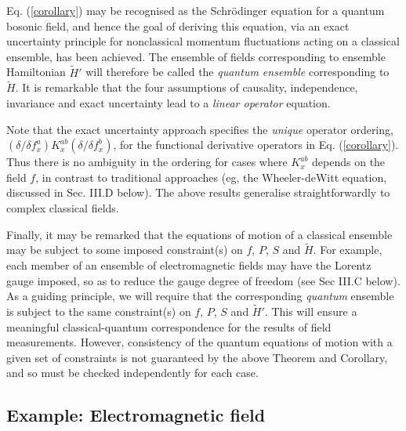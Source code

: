 \documentclass[a4paper,preprint, showpacs, aps, draft]{revtex4}
\begin{document}
{Eq. (\ref{corollary}) may be recognised as the Schr\"{o}dinger equation
for a quantum bosonic field, and hence the goal of
deriving this equation, via an exact uncertainty principle for 
nonclassical
momentum fluctuations acting on a classical ensemble, has been achieved.  
The ensemble of fields corresponding to ensemble Hamiltonian
$\tilde{H}'$ will therefore be called the {\it quantum ensemble}
corresponding to $\tilde{H}$. It is remarkable that the four assumptions
of causality, independence, invariance and exact uncertainty lead to a {\it
linear operator} equation. 

Note that the
exact uncertainty approach specifies the {\it unique} operator ordering,
$(\delta/\delta f^a_x)K^{ab}_x(\delta/\delta f^b_x)$,
for the functional derivative operators in Eq. (\ref{corollary}).  Thus
there is no ambiguity in the ordering for cases where $K^{ab}_x$ depends on
the field $f$, in contrast to traditional
approaches (eg, the Wheeler-deWitt equation, discussed in Sec.
III.D below).  The above results generalise straightforwardly to complex
classical fields.  

Finally, it may be remarked that the equations of motion of a classical
ensemble may be subject to some imposed constraint(s) on $f$, $P$, $S$ and
$\tilde{H}$.  For example, each
member of an ensemble of electromagnetic fields may have the Lorentz gauge 
imposed, so as to reduce the gauge degree of freedom (see Sec III.C
below). As a guiding principle, we will require that the corresponding
{\it quantum} ensemble is subject to the same constraint(s) on $f$, $P$, $S$
and $\tilde{H}'$.  This will ensure a meaningful classical-quantum
correspondence for the results of field measurements.  However,
consistency of the quantum equations of motion with a given set of
constraints is not guaranteed by the above Theorem and Corollary, and so
must be checked independently for each case.

\subsection{Example: Electromagnetic field}

}
\end{document}
